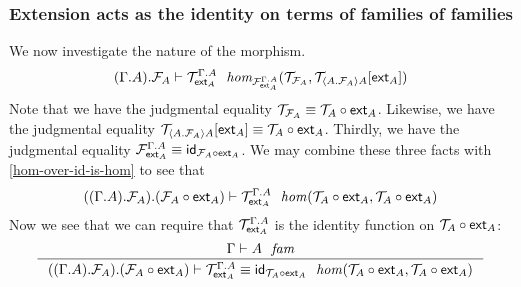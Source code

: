 \subsubsection{Extension acts as the identity on terms of families of families}
We now investigate the nature of the morphism.
\begin{equation*}
\jfhom
  {{{\Gamma}{A}}{\mfam{A}}}
  {\mfam{\mfam{A}}}
  {\subst{\tfext{A}}{\mfam{\ctxwk{\ctxext{A}{\mfam{A}}}{A}}}}
  {\mfam{\tfext{A}}^{\ctxext{\Gamma}{A}}}
  {\mtm{\mfam{A}}}
  {\subst{\tfext{A}}{\mtm{\ctxwk{\ctxext{A}{\mfam{A}}}{A}}}}
  {\mtm{\tfext{A}}^{\ctxext{\Gamma}{A}}}
\end{equation*}
Note that we have the judgmental equality 
$\mtm{\mfam{A}}\jdeq\jcomp{}{\tfext{A}}{\mtm{A}}$. Likewise, we have the
judgmental equality $\subst{\tfext{A}}{\mtm{\ctxwk{\ctxext{A}{\mfam{A}}}{A}}}
\jdeq\jcomp{}{\tfext{A}}{\mtm{A}}$. Thirdly, we have the judgmental equality
$\mfam{\tfext{A}}^{\ctxext{\Gamma}{A}}\jdeq\idfunc[\jcomp{}{\tfext{A}}{\mfam{A}}]$.
We may combine these three facts with \autoref{hom-over-id-is-hom} to see that
\begin{equation*}
\jhom
  {{{{\Gamma}{A}}{\mfam{A}}}{\jcomp{}{\tfext{A}}}{\mfam{A}}}
  {\jcomp{}{\tfext{A}}{\mtm{A}}}
  {\jcomp{}{\tfext{A}}{\mtm{A}}}
  {\mtm{\tfext{A}}^{\ctxext{\Gamma}{A}}}
\end{equation*}
Now we see that we can require that $\mtm{\tfext{A}}^{\ctxext{\Gamma}{A}}$ is
the identity function on $\jcomp{}{\tfext{A}}{\mtm{A}}$:
\begin{equation*}
\inference
  { \jfam{\Gamma}{A}
    }
  { \jhomeq
    {{{{\Gamma}{A}}{\mfam{A}}}{\jcomp{}{\tfext{A}}}{\mfam{A}}}
    {\jcomp{}{\tfext{A}}{\mtm{A}}}
    {\jcomp{}{\tfext{A}}{\mtm{A}}}
    {\mtm{\tfext{A}}^{\ctxext{\Gamma}{A}}}
    {\idfunc[\jcomp{}{\tfext{A}}{\mtm{A}}]}
    }
\end{equation*}

